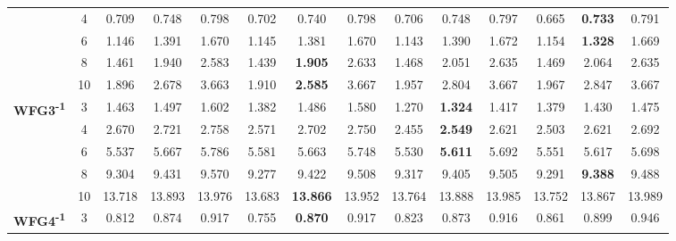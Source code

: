 \documentclass[onecolumn,10pt]{asme2ej}
\begin{document}
\begin{table}[!htb]
\begin{tabular}{|c|c|c|c|c|c|c|c|c|c|c|c|c|c|}
		& 4          & 0.709         & 0.748          & 0.798          & 0.702         & 0.740           & 0.798          & 0.706         & 0.748          & 0.797          & 0.665         & \textbf{0.733} & 0.791          \\ \cline{2-14} 
		& 6          & 1.146         & 1.391          & 1.670          & 1.145         & 1.381           & 1.670          & 1.143         & 1.390          & 1.672          & 1.154         & \textbf{1.328} & 1.669          \\ \cline{2-14} 
		& 8          & 1.461         & 1.940          & 2.583          & 1.439         & \textbf{1.905}  & 2.633          & 1.468         & 2.051          & 2.635          & 1.469         & 2.064          & 2.635          \\ \cline{2-14} 
		& 10         & 1.896         & 2.678          & 3.663          & 1.910         & \textbf{2.585}  & 3.667          & 1.957         & 2.804          & 3.667          & 1.967         & 2.847          & 3.667          \\ \hline
		\multirow{5}{*}{\textbf{WFG3\textsuperscript{-1}}} & 3          & 1.463         & 1.497          & 1.602          & 1.382         & 1.486           & 1.580          & 1.270         & \textbf{1.324} & 1.417          & 1.379         & 1.430          & 1.475          \\ \cline{2-14} 
		& 4          & 2.670         & 2.721          & 2.758          & 2.571         & 2.702           & 2.750          & 2.455         & \textbf{2.549} & 2.621          & 2.503         & 2.621          & 2.692          \\ \cline{2-14} 
		& 6          & 5.537         & 5.667          & 5.786          & 5.581         & 5.663           & 5.748          & 5.530         & \textbf{5.611} & 5.692          & 5.551         & 5.617          & 5.698          \\ \cline{2-14} 
		& 8          & 9.304         & 9.431          & 9.570          & 9.277         & 9.422           & 9.508          & 9.317         & 9.405          & 9.505          & 9.291         & \textbf{9.388} & 9.488          \\ \cline{2-14} 
		& 10         & 13.718        & 13.893         & 13.976         & 13.683        & \textbf{13.866} & 13.952         & 13.764        & 13.888         & 13.985         & 13.752        & 13.867         & 13.989         \\ \hline
		\multirow{5}{*}{\textbf{WFG4\textsuperscript{-1}}} & 3          & 0.812         & 0.874          & 0.917          & 0.755         & \textbf{0.870}  & 0.917          & 0.823         & 0.873          & 0.916          & 0.861         & 0.899          & 0.946          \\ \cline{2-14} 

\end{tabular}
\end{table}
\end{document}
